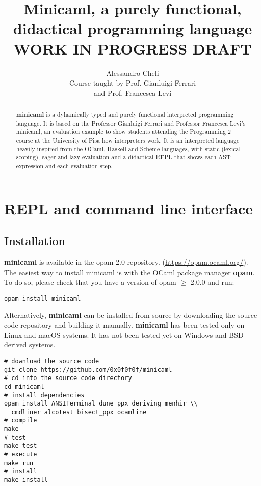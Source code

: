 \documentclass[a4paper, 10pt]{article}
\title{Minicaml, a purely functional, didactical programming language\\WORK IN PROGRESS DRAFT}
\author{Alessandro Cheli\\Course taught by Prof. Gianluigi Ferrari\\and Prof. Francesca Levi}
\theoremstyle{plain}%
\theoremstyle{definition}
\theoremstyle{remark}
\begin{document}
\maketitle

\begin{abstract}
\textbf{minicaml} is a dyhamically typed and purely functional interpreted
programming language. It is based on the Professor Gianluigi Ferrari and
Professor Francesca Levi's minicaml, an evaluation example to show students
attending the Programming 2 course at the University of Pisa how interpreters
work. It is an interpreted language heavily inspired from the OCaml, Haskell and
Scheme languages, with static (lexical scoping), eager and lazy evaluation and a
didactical REPL that shows each AST expression and each evaluation step.
\end{abstract}

\section{REPL and command line interface}
\subsection{Installation}
\textbf{minicaml} is available in the opam 2.0 repository.
(\url{https://opam.ocaml.org/}). The easiest way to install minicaml is with the
OCaml package manager \textbf{opam}. To do so, please check that you have a version of opam $\geq$
2.0.0 and run:
\begin{lstlisting}[style=bash]
opam install minicaml
\end{lstlisting}
Alternatively, \textbf{minicaml} can be installed from source by downloading the
source code repository and building it manually. \textbf{minicaml} has been tested
only on Linux and macOS systems. It has not been tested yet on Windows and BSD
derived systems.
\begin{lstlisting}[style=bash]
# download the source code
git clone https://github.com/0x0f0f0f/minicaml
# cd into the source code directory
cd minicaml
# install dependencies
opam install ANSITerminal dune ppx_deriving menhir \\
  cmdliner alcotest bisect_ppx ocamline
# compile
make
# test
make test
# execute
make run
# install
make install
\end{lstlisting}

\clearpage
\end{document}
